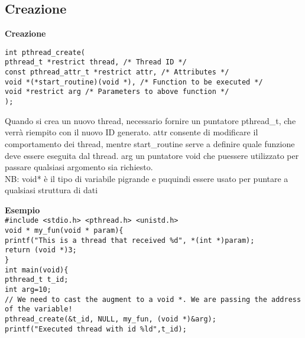 \begin{flushleft}
  \subsection{Creazione}
  \begin{flushleft}
    \textbf{Creazione}\\
    \begin{flushleft}
      \texttt{int pthread\_create(\\
              pthread\_t *restrict thread, /* Thread ID */\\
              const pthread\_attr\_t *restrict attr, /* Attributes */\\
              void *(*start\_routine)(void *), /* Function to be executed */\\
              void *restrict arg /* Parameters to above function */\\
              );}
    \end{flushleft}
    Quando si crea un nuovo thread, \ace necessario fornire un puntatore pthread\_t, che 
    verrà riempito con il nuovo ID generato. attr consente di modificare il 
    comportamento dei thread, mentre start\_routine serve a definire quale funzione 
    deve essere eseguita dal thread. arg \ace un puntatore void che pu\aco essere utilizzato per 
    passare qualsiasi argomento sia richiesto. \\
    NB: void* è il tipo di variabile pi\acu grande e pu\aco quindi essere usato per puntare a qualsiasi struttura di dati
  \end{flushleft}
  \begin{flushleft}
    \textbf{Esempio}\\
    \texttt{\#include <stdio.h> <pthread.h> <unistd.h> \\
    void * my\_fun(void * param)\{ \\
    \halftab printf("This is a thread that received \%d\n", *(int *)param);\\
    \halftab return (void *)3;\\
    \} \\
    int main(void)\{ \\
    \halftab pthread\_t t\_id;\\
    \halftab int arg=10;\\
    // We need to cast the augment to a void *. We are passing the address of the variable!\\
    \halftab pthread\_create(\&t\_id, NULL, my\_fun, (void *)\&arg);\\
    \halftab printf("Executed thread with id \%ld\n",t\_id);\\
}
\end{flushleft}
\end{flushleft}
